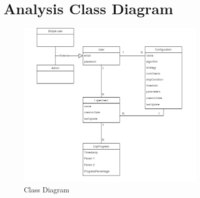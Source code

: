 
\newpage
\section{Analysis Class Diagram}

\begin{figure}[ht!]
    \centering
    \includegraphics[width=0.8\textwidth]{images/2_analisys/FL_class_diag.png}
    \caption{Class Diagram}
    \label{fig:class_diagram}
\end{figure}


